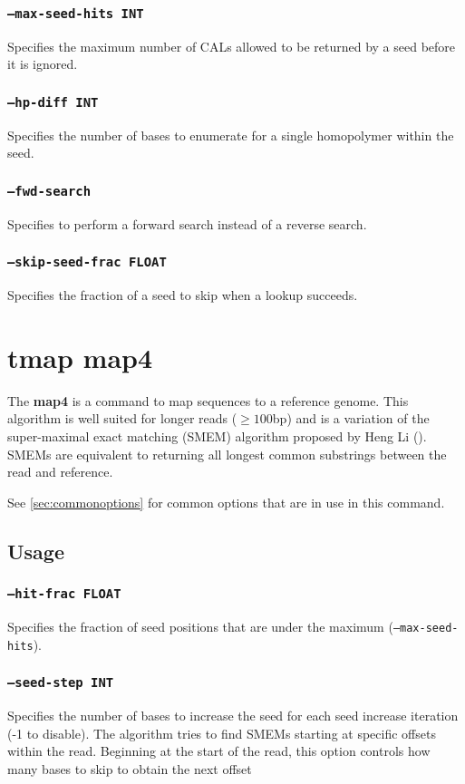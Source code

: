 \documentclass[a4paper,12pt]{book}
\newcommand{\TT}[1]{{\tt #1}} %
\newcommand{\BF}[1]{{\bf #1}} %
\begin{document}
\subsubsection{\TT{--max-seed-hits INT}}
Specifies the maximum number of CALs allowed to be returned by a seed before it is ignored.

\subsubsection{\TT{--hp-diff INT}}
Specifies the number of bases to enumerate for a single homopolymer within the seed.

\subsubsection{\TT{--fwd-search}}
Specifies to perform a forward search instead of a reverse search.

\subsubsection{\TT{--skip-seed-frac FLOAT}}
Specifies the fraction of a seed to skip when a lookup succeeds.

\section{tmap map4}
\label{sec:map4}
The \BF{map4} is a command to map sequences to a reference genome.
This algorithm is well suited for longer reads ($\geq 100$bp) and is a variation of the super-maximal exact matching (SMEM) algorithm proposed by Heng Li (\cite{Fastmap}).
SMEMs are equivalent to returning all longest common substrings between the read and reference.

See \autoref{sec:commonoptions} for common options that are in use in this command.

\subsection{Usage}

\subsubsection{\TT{--hit-frac FLOAT}}
Specifies the fraction of seed positions that are under the maximum (\TT{--max-seed-hits}).

\subsubsection{\TT{--seed-step INT}}
Specifies the number of bases to increase the seed for each seed increase iteration (-1 to disable).
The algorithm tries to find SMEMs starting at specific offsets within the read.
Beginning at the start of the read, this option controls how many bases to skip to obtain the next offset
\end{document}
